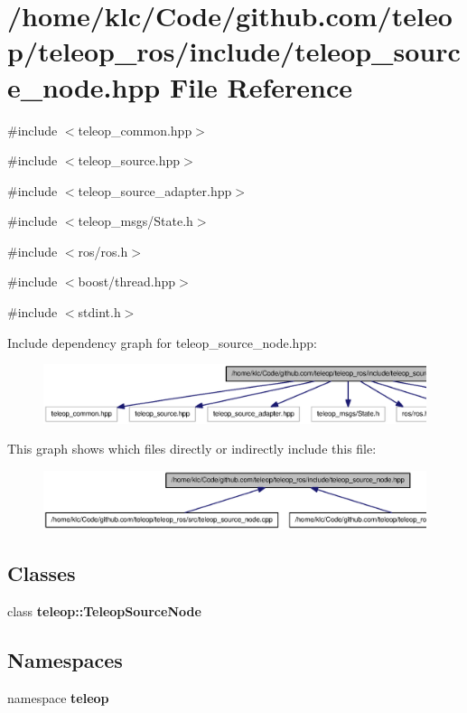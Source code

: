 \section{/home/klc/Code/github.com/teleop/teleop\_\-ros/include/teleop\_\-source\_\-node.hpp File Reference}
\label{teleop__source__node_8hpp}
{\ttfamily \#include $<$teleop\_\-common.hpp$>$}\par
{\ttfamily \#include $<$teleop\_\-source.hpp$>$}\par
{\ttfamily \#include $<$teleop\_\-source\_\-adapter.hpp$>$}\par
{\ttfamily \#include $<$teleop\_\-msgs/State.h$>$}\par
{\ttfamily \#include $<$ros/ros.h$>$}\par
{\ttfamily \#include $<$boost/thread.hpp$>$}\par
{\ttfamily \#include $<$stdint.h$>$}\par
Include dependency graph for teleop\_\-source\_\-node.hpp:
\nopagebreak
\begin{figure}[H]
\begin{center}
\leavevmode
\includegraphics[width=400pt]{teleop__source__node_8hpp__incl}
\end{center}
\end{figure}
This graph shows which files directly or indirectly include this file:
\nopagebreak
\begin{figure}[H]
\begin{center}
\leavevmode
\includegraphics[width=400pt]{teleop__source__node_8hpp__dep__incl}
\end{center}
\end{figure}
\subsection*{Classes}
\begin{DoxyCompactItemize}
\item 
class {\bf teleop::TeleopSourceNode}
\end{DoxyCompactItemize}
\subsection*{Namespaces}
\begin{DoxyCompactItemize}
\item 
namespace {\bf teleop}
\end{DoxyCompactItemize}
